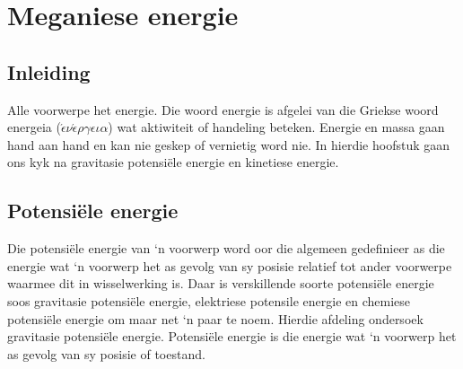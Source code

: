 \chapter{Meganiese energie} \label{chap:energy}
    \setcounter{figure}{1}
    \setcounter{subfigure}{1}
    \label{1fc5ba69690764517c30802fdf7b1905}
         \section{Inleiding}
    \nopagebreak
            \label{m38784*id7521}
Alle voorwerpe het energie. Die woord energie is afgelei van die Griekse woord energeia ($\acute{\epsilon} \nu \acute{\epsilon} \rho \gamma \epsilon \iota \alpha $) wat aktiwiteit of handeling beteken. Energie en massa gaan hand aan hand en kan nie geskep of vernietig word nie. In hierdie hoofstuk gaan ons kyk na gravitasie potensiële energie en kinetiese energie. \label{m38784*cid4}


\section{Potensi\"{e}le energie}
            \nopagebreak
Die potensi\"{e}le energie van ‘n voorwerp word oor die algemeen gedefinieer as die energie wat ‘n voorwerp het as gevolg van sy posisie relatief tot ander voorwerpe waarmee dit in wisselwerking is. Daar is verskillende soorte potensiële energie soos gravitasie potensi\"{e}le energie, elektriese potensile energie en chemiese potensiële energie om maar net ‘n paar te noem. Hierdie afdeling ondersoek gravitasie potensi\"{e}le energie. 
 { Potensi\"{e}le energie is die energie wat ‘n voorwerp het as gevolg van sy posisie of toestand.} 


